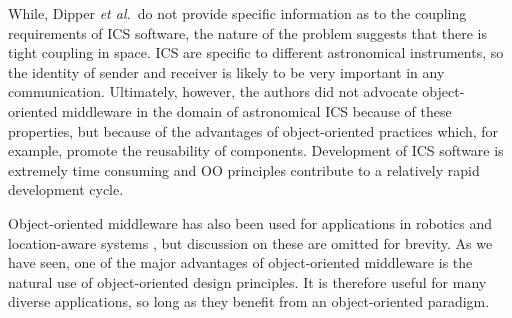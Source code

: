 \documentclass{acm_proc_article-sp}
\def\etal{{\it et al.\/}}
\begin{document}
While, Dipper \etal\ do not provide specific information as to the coupling requirements of ICS software, the nature of the problem suggests that there is tight coupling in space.  ICS are specific to different astronomical instruments, so the identity of sender and receiver is likely to be very important in any communication.  Ultimately, however, the authors did not advocate object-oriented middleware in the domain of astronomical ICS because of these properties, but because of the advantages of object-oriented practices which, for example, promote the reusability of components.  Development of ICS software is extremely time consuming and OO principles  contribute to a relatively rapid development cycle.

Object-oriented middleware has also been used for applications in robotics \cite{Mohamed:2011p8374} and location-aware systems \cite{Jarvensivu:2004p8369}, but discussion on these are omitted for brevity.  As we have seen, one of the major advantages of object-oriented middleware is the natural use of object-oriented design principles.  It is therefore useful for many diverse applications, so long as they benefit from an object-oriented paradigm.



\end{document}
